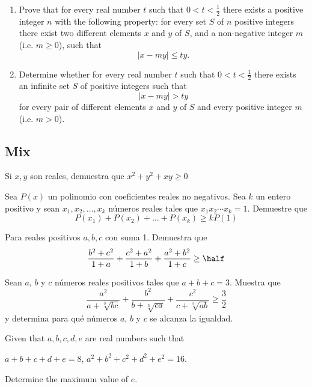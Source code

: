 \documentclass[11pt]{scrartcl}
\begin{document}
\begin{problem} [EGMO 2018/6]
    
    \begin{enumerate}[a]

        \item  Prove that for every real number $t$ such that $0 < t < \tfrac{1}{2}$ there exists a positive integer $n$ with the following property: for every set $S$ of $n$ positive integers there exist two different elements $x$ and $y$ of $S$, and a non-negative integer $m$ (i.e. $m \ge 0 $), such that\[ |x-my|\leq ty.\]
    \item Determine whether for every real number $t$ such that $0 < t < \tfrac{1}{2} $ there exists an infinite set $S$ of positive integers such that\[|x-my| > ty\]for every pair of different elements $x$ and $y$ of $S$ and every positive integer $m$ (i.e. $m > 0$).
\end{enumerate}
\end{problem}
\subsection{Mix}

\begin{problem}
    Si $x,y$ son reales, demuestra que $x^2+y^2+xy \geq 0$
\end{problem}
\begin{problem}  [OMCC 2020/5]
Sea $P(x)$ un polinomio con coeficientes reales no negativos. Sea $k$ un entero positivo y sean $x_1,x_2,\ldots,x_k$ números reales tales que $x_1x_2\cdots x_k=1$. Demuestre que
$$P(x_1)+P(x_2)+\ldots+P(x_k)\geq kP(1)$$

\end{problem}


\begin{problem}
    Para reales positivos $a,b,c$ con suma 1. Demuestra que 
    \[\frac{b^2+c^2}{1+a}+\frac{c^2+a^2}{1+b}+\frac{a^2+b^2}{1+c}\geq \half\]
\end{problem}

\begin{problem} [OMM 2014/5]
    
    Sean $a$, $b$ y $c$ números reales positivos tales que $a + b + c = 3$. Muestra que 
\[ \frac{a^2}{a + \sqrt[3]{bc}} + \frac{b^2}{b + \sqrt[3]{ca}} + \frac{c^2}{c + \sqrt[3]{ab}} \geq \frac{3}{2} \]
y determina para qué números $a$, $b$ y $c$ se alcanza la igualdad.
\end{problem}

\begin{problem} [USAMO 1978/1]
    Given that $a,b,c,d,e$ are real numbers such that

$a+b+c+d+e=8$,
$a^2+b^2+c^2+d^2+e^2=16$.

Determine the maximum value of $e$.
\end{problem}
\end{document}
